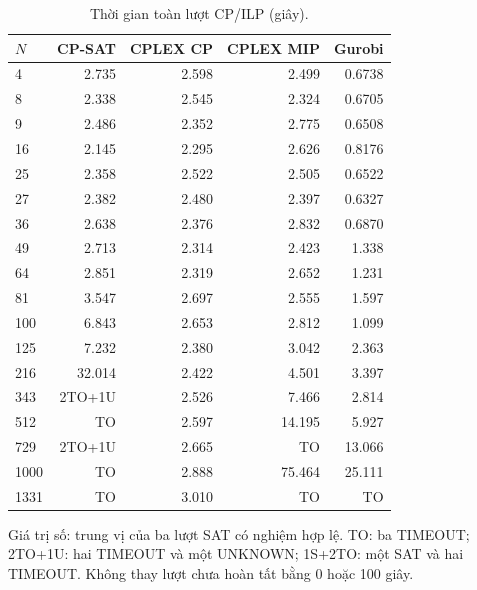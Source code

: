 \begin{table}[pos=H]
\centering
\small
\caption{Thời gian toàn lượt CP/ILP (giây).}
\label{tab:native_total}
\setlength{\tabcolsep}{4pt}
\begin{tabular}{@{}lrrrr@{}}
\toprule
$N$ & CP-SAT & CPLEX CP & CPLEX MIP & Gurobi \\
\midrule
4 & 2.735 & 2.598 & 2.499 & 0.6738 \\
8 & 2.338 & 2.545 & 2.324 & 0.6705 \\
9 & 2.486 & 2.352 & 2.775 & 0.6508 \\
16 & 2.145 & 2.295 & 2.626 & 0.8176 \\
25 & 2.358 & 2.522 & 2.505 & 0.6522 \\
27 & 2.382 & 2.480 & 2.397 & 0.6327 \\
36 & 2.638 & 2.376 & 2.832 & 0.6870 \\
49 & 2.713 & 2.314 & 2.423 & 1.338 \\
64 & 2.851 & 2.319 & 2.652 & 1.231 \\
81 & 3.547 & 2.697 & 2.555 & 1.597 \\
100 & 6.843 & 2.653 & 2.812 & 1.099 \\
125 & 7.232 & 2.380 & 3.042 & 2.363 \\
216 & 32.014 & 2.422 & 4.501 & 3.397 \\
343 & 2TO+1U & 2.526 & 7.466 & 2.814 \\
512 & TO & 2.597 & 14.195 & 5.927 \\
729 & 2TO+1U & 2.665 & TO & 13.066 \\
1000 & TO & 2.888 & 75.464 & 25.111 \\
1331 & TO & 3.010 & TO & TO \\
\bottomrule
\end{tabular}
\par\smallskip\begin{minipage}{\linewidth}\footnotesize Giá trị số: trung vị của ba lượt SAT có nghiệm hợp lệ. TO: ba TIMEOUT; 2TO+1U: hai TIMEOUT và một UNKNOWN; 1S+2TO: một SAT và hai TIMEOUT. Không thay lượt chưa hoàn tất bằng 0 hoặc 100 giây.\end{minipage}
\end{table}

